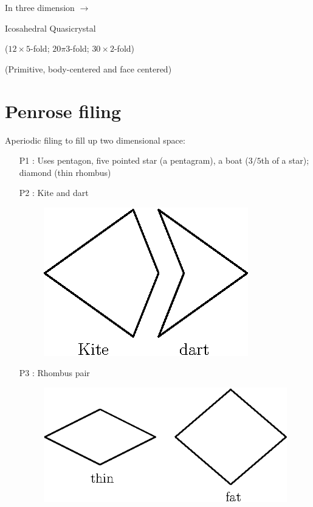 In three dimension $\to$

Icosahedral Quasicrystal

($12\times 5$-fold; $20\pi 3$-fold; $30\times 2$-fold)

(Primitive, body-centered and face centered)

\section*{Penrose filing}

Aperiodic filing to fill up two dimensional space:
\begin{itemize}
\item[P1 :] Uses pentagon, five pointed star (a pentagram), a boat ($3/5$th of a star); diamond (thin rhombus)

\item[P2 :] Kite and dart
\begin{figure}[H]
\centering
\includegraphics{images/lecture2/fig4.eps}
\end{figure}

\item[P3 :] Rhombus pair
\begin{figure}[H]
\centering
\includegraphics{images/lecture2/fig5.eps}
\end{figure}
\end{itemize}

